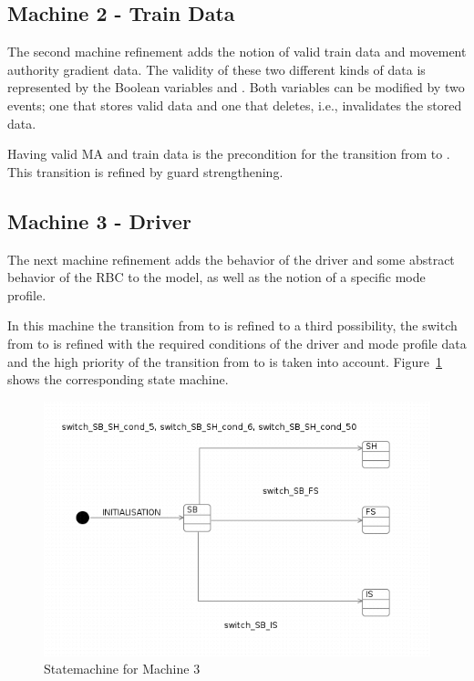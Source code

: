 \documentclass{template/openetcs_article}
\begin{document}
\subsection{Machine 2 - Train Data}
\label{sec:machine-2-train}

The second machine refinement adds the notion of valid train data and movement
authority gradient data. The validity of these two different kinds of data is
represented by the Boolean variables  and
. Both variables can be modified by two events;
one that stores valid data and one that deletes, i.e., invalidates the stored
data.


Having valid MA and train data is the precondition for the transition from
 to . This transition is refined by guard strengthening.



\subsection{Machine 3 - Driver}
\label{sec:machine-3-driver}

The next machine refinement adds the behavior of the driver and some abstract
behavior of the RBC to the model, as well as the notion of a specific mode
profile.

In this machine the transition from  to  is refined to a third
possibility, the switch from  to  is refined with the required
conditions of the driver and mode profile data and the high priority of the
transition from  to  is taken into
account. Figure~\ref{fig:statemachine-m3} shows the corresponding state machine.

\begin{figure}[ht]
  \centering
  \includegraphics[width=.75\textwidth]{statechart4}
  \caption{Statemachine for Machine 3}
  \label{fig:statemachine-m3}
\end{figure}
\end{document}
